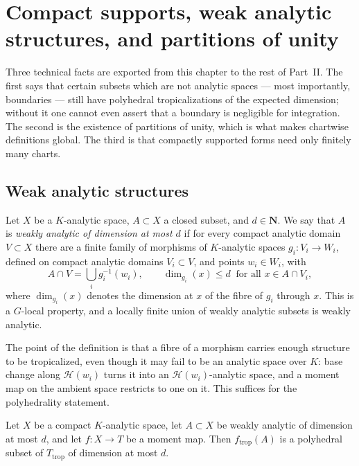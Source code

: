 \section{Compact supports, weak analytic structures, and partitions of unity}
\label{sec:trop-supports}

Three technical facts are exported from this chapter to the rest of Part~II.
The first says that certain subsets which are not analytic spaces --- most
importantly, boundaries --- still have polyhedral tropicalizations of the
expected dimension; without it one cannot even assert that a boundary is
negligible for integration. The second is the existence of partitions of
unity, which is what makes chartwise definitions global. The third is that
compactly supported forms need only finitely many charts.

\subsection{Weak analytic structures}

\begin{definition}
\label{def:trop-weakly-analytic}
Let $X$ be a $K$-analytic space, $A\subset X$ a closed subset, and
$d\in\mathbf N$. We say that $A$ is \emph{weakly analytic of dimension at
most $d$} if for every compact analytic domain $V\subset X$ there are a
finite family of morphisms of $K$-analytic spaces $g_i:V_i\to W_i$, defined
on compact analytic domains $V_i\subset V$, and points $w_i\in W_i$, with
\[
 A\cap V=\bigcup_ig_i^{-1}(w_i),
 \qquad
 \dim_{g_i}(x)\le d\ \text{ for all }x\in A\cap V_i,
\]
where $\dim_{g_i}(x)$ denotes the dimension at $x$ of the fibre of $g_i$
through $x$. This is a $G$-local property, and a locally finite union of
weakly analytic subsets is weakly analytic.
\end{definition}

The point of the definition is that a fibre of a morphism carries enough
structure to be tropicalized, even though it may fail to be an analytic
space over $K$: base change along $\mathcal H(w_i)$ turns it into an
$\mathcal H(w_i)$-analytic space, and a moment map on the ambient space
restricts to one on it. This suffices for the polyhedrality statement.

\begin{proposition}
\label{prop:trop-weakly-analytic-image}
Let $X$ be a compact $K$-analytic space, let $A\subset X$ be weakly analytic
of dimension at most $d$, and let $f:X\to T$ be a moment map. Then
$f_{\mathrm{trop}}(A)$ is a polyhedral subset of $T_{\mathrm{trop}}$ of
dimension at most $d$.
\end{proposition}

